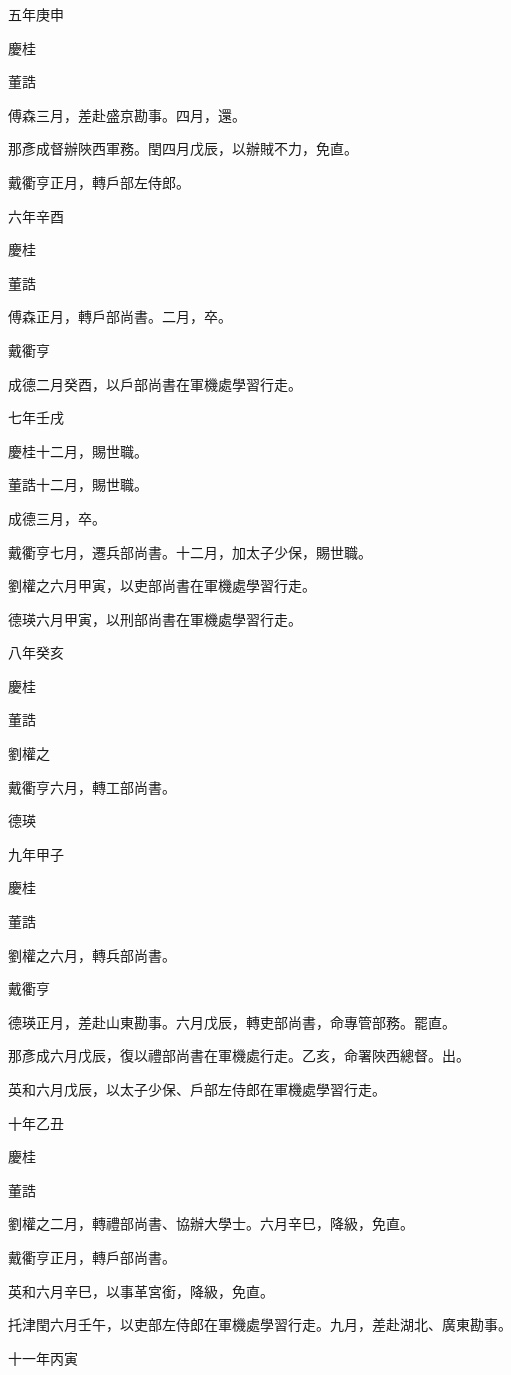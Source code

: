 \begin{pinyinscope}
五年庚申

慶桂

董誥

傅森三月，差赴盛京勘事。四月，還。

那彥成督辦陜西軍務。閏四月戊辰，以辦賊不力，免直。

戴衢亨正月，轉戶部左侍郎。

六年辛酉

慶桂

董誥

傅森正月，轉戶部尚書。二月，卒。

戴衢亨

成德二月癸酉，以戶部尚書在軍機處學習行走。

七年壬戌

慶桂十二月，賜世職。

董誥十二月，賜世職。

成德三月，卒。

戴衢亨七月，遷兵部尚書。十二月，加太子少保，賜世職。

劉權之六月甲寅，以吏部尚書在軍機處學習行走。

德瑛六月甲寅，以刑部尚書在軍機處學習行走。

八年癸亥

慶桂

董誥

劉權之

戴衢亨六月，轉工部尚書。

德瑛

九年甲子

慶桂

董誥

劉權之六月，轉兵部尚書。

戴衢亨

德瑛正月，差赴山東勘事。六月戊辰，轉吏部尚書，命專管部務。罷直。

那彥成六月戊辰，復以禮部尚書在軍機處行走。乙亥，命署陜西總督。出。

英和六月戊辰，以太子少保、戶部左侍郎在軍機處學習行走。

十年乙丑

慶桂

董誥

劉權之二月，轉禮部尚書、協辦大學士。六月辛巳，降級，免直。

戴衢亨正月，轉戶部尚書。

英和六月辛巳，以事革宮銜，降級，免直。

托津閏六月壬午，以吏部左侍郎在軍機處學習行走。九月，差赴湖北、廣東勘事。

十一年丙寅


\end{pinyinscope}
